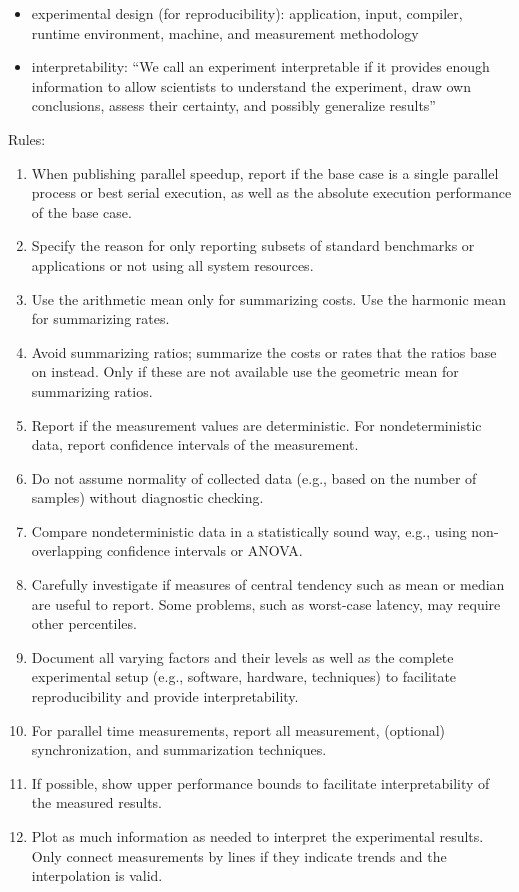 \begin{itemize}
    \item experimental design (for reproducibility): application, input, compiler, runtime environment, machine, and measurement methodology
    \item interpretability: \enquote{We call an experiment interpretable if it provides enough information to allow scientists to understand the experiment, draw own conclusions, assess their certainty, and possibly generalize results}
\end{itemize}

Rules:
\begin{enumerate}
    \item When publishing parallel speedup, report if the base case is a single parallel process or best serial execution, as well as the absolute execution performance of the base case.
    \item Specify the reason for only reporting subsets of standard benchmarks or applications or not using all system resources.
    \item Use the arithmetic mean only for summarizing costs. Use the harmonic mean for summarizing rates.
    \item Avoid summarizing ratios; summarize the costs or rates that the ratios base on instead. Only if these are not available use the geometric mean for summarizing ratios.
    \item Report if the measurement values are deterministic. For nondeterministic data, report confidence intervals of the measurement.
    \item Do not assume normality of collected data (e.g., based on the number of samples) without diagnostic checking.
    \item Compare nondeterministic data in a statistically sound way, e.g., using non-overlapping confidence intervals or ANOVA.
    \item Carefully investigate if measures of central tendency such as mean or median are useful to report. Some problems, such as worst-case latency, may require other percentiles.
    \item Document all varying factors and their levels as well as the complete experimental setup (e.g., software, hardware, techniques) to facilitate reproducibility and provide interpretability.
    \item For parallel time measurements, report all measurement, (optional) synchronization, and summarization techniques.
    \item If possible, show upper performance bounds to facilitate interpretability of the measured results.
    \item Plot as much information as needed to interpret the experimental results. Only connect measurements by lines if they indicate trends and the interpolation is valid.
\end{enumerate}

